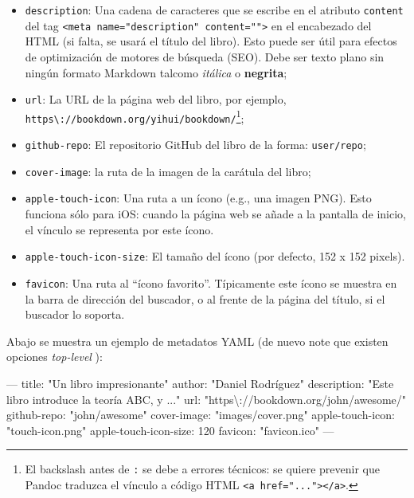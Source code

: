 \documentclass[12pt,]{krantz}
\makeatletter
\newenvironment{Shaded}{\begin{snugshade}}{\end{snugshade}}
\newcommand{\StringTok}[1]{\textcolor[rgb]{0.31,0.60,0.02}{{#1}}}
\newcommand{\OtherTok}[1]{\textcolor[rgb]{0.56,0.35,0.01}{{#1}}}
\newcommand{\FunctionTok}[1]{\textcolor[rgb]{0.00,0.00,0.00}{{#1}}}
\newcommand{\NormalTok}[1]{{#1}}
\providecommand{\tightlist}{%
  \setlength{\itemsep}{0pt}\setlength{\parskip}{0pt}}
\newenvironment{kframe}{%
\medskip{}
\setlength{\fboxsep}{.8em}
 \def\at@end@of@kframe{}%
 \ifinner\ifhmode%
  \def\at@end@of@kframe{\end{minipage}}%
  \begin{minipage}{\columnwidth}%
 \fi\fi%
 \def\FrameCommand##1{\hskip\@totalleftmargin \hskip-\fboxsep
 \colorbox{shadecolor}{##1}\hskip-\fboxsep
     \hskip-\linewidth \hskip-\@totalleftmargin \hskip\columnwidth}%
 \MakeFramed {\advance\hsize-\width
   \@totalleftmargin\z@ \linewidth\hsize
   \@setminipage}}%
 {\par\unskip\endMakeFramed%
 \at@end@of@kframe}
\renewenvironment{Shaded}{\begin{kframe}}{\end{kframe}}
\theoremstyle{definition}
\theoremstyle{definition}
\theoremstyle{remark}
\makeatother
\begin{document}
\begin{itemize}
\tightlist
\item
  \texttt{description}: Una cadena de caracteres que se escribe en el
  atributo \texttt{content} del tag
  \texttt{\textless{}meta\ name="description"\ content=""\textgreater{}}
  en el encabezado del HTML (si falta, se usará el título del libro).
  Esto puede ser útil para efectos de optimización de motores de
  búsqueda (SEO). Debe ser texto plano sin ningún formato Markdown
  talcomo \emph{itálica} o \textbf{negrita};
\item
  \texttt{url}: La URL de la página web del libro, por ejemplo,
  \texttt{https\textbackslash{}://bookdown.org/yihui/bookdown/}\footnote{El
    backslash antes de \texttt{:} se debe a errores técnicos: se quiere
    prevenir que Pandoc traduzca el vínculo a código HTML
    \texttt{\textless{}a\ href="..."\textgreater{}\textless{}/a\textgreater{}}.};
\item
  \texttt{github-repo}: El repositorio GitHub del libro de la forma:
  \texttt{user/repo};
\item
  \texttt{cover-image}: la ruta de la imagen de la carátula del libro;
\item
  \texttt{apple-touch-icon}: Una ruta a un ícono (e.g., una imagen PNG).
  Esto funciona sólo para iOS: cuando la página web se añade a la
  pantalla de inicio, el vínculo se representa por este ícono.
\item
  \texttt{apple-touch-icon-size}: El tamaño del ícono (por defecto, 152
  x 152 pixels).
\item
  \texttt{favicon}: Una ruta al ``ícono favorito''. Típicamente este
  ícono se muestra en la barra de dirección del buscador, o al frente de
  la página del título, si el buscador lo soporta.
\end{itemize}

Abajo se muestra un ejemplo de metadatos YAML (de nuevo note que existen
opciones \emph{top-level} ):

\begin{Shaded}
\begin{Highlighting}[]
\OtherTok{---}
\FunctionTok{title:} \StringTok{"Un libro impresionante"}
\FunctionTok{author:} \StringTok{"Daniel Rodríguez"}
\FunctionTok{description:} \StringTok{"Este libro introduce la teoría ABC, y ..."}
\FunctionTok{url:} \StringTok{"https\textbackslash{}://bookdown.org/john/awesome/"}
\FunctionTok{github-repo:} \StringTok{"john/awesome"}
\FunctionTok{cover-image:} \StringTok{"images/cover.png"}
\FunctionTok{apple-touch-icon:} \StringTok{"touch-icon.png"}
\FunctionTok{apple-touch-icon-size:} \NormalTok{120}
\FunctionTok{favicon:} \StringTok{"favicon.ico"}
\OtherTok{---}
\end{Highlighting}
\end{Shaded}
\end{document}
